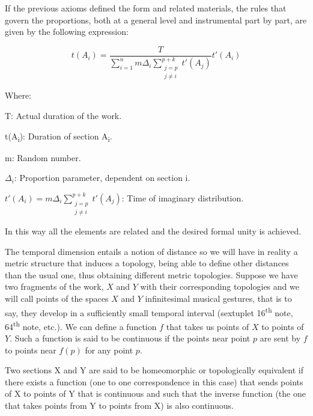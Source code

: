 If the previous axioms defined the form and related materials, the rules that govern the proportions, both at a general level and instrumental part by part, are given by the following expression:

\begin{equation}
t(A_{i}) = \frac{T}{\displaystyle\sum_{i=1}^{n} m \Delta_{i} \textstyle\sum_{\substack{j=p\\ j \neq i}}^{p+k} t'(A_{j})} t'(A_{i})
\label{eq:rhea}
\end{equation}

Where:

T: Actual duration of the work.

t(A\textsubscript{i}): Duration of section A\textsubscript{i}.

m: Random number.

$\Delta_{i}$: Proportion parameter, dependent on section i.

$t'(A_{i})=m\Delta_{i}\displaystyle\sum_{\substack{j=p\\ j \neq i}}^{p+k} t'(A_{j})$: Time of imaginary distribution.

In this way all the elements are related and the desired formal unity is achieved.

The temporal dimension entails a notion of distance so we will have in reality a metric structure that induces a topology, being able to define other distances than the usual one, thus obtaining different metric topologies. Suppose we have two fragments of the work, $X$ and $Y$ with their corresponding topologies and we will call points of the spaces $X$ and $Y$ infinitesimal musical gestures, that is to say, they develop in a sufficiently small temporal interval (sextuplet 16\textsuperscript{th} note, 64\textsuperscript{th} note, etc.). We can define a function $f$ that takes us points of $X$ to points of $Y$. Such a function is said to be continuous if the points near point $p$ are sent by $f$ to points near $f(p)$ for any point $p$.

Two sections X and Y are said to be homeomorphic or topologically equivalent if there exists a function (one to one correspondence in this case) that sends points of X to points of Y that is continuous and such that the inverse function (the one that takes points from Y to points from X) is also continuous.


